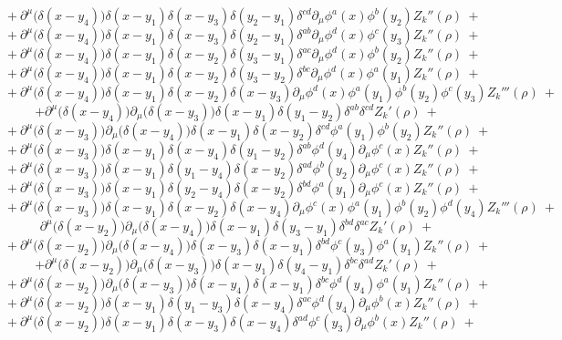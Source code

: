 $$+\ \partial^\mu\big(\delta(x - y_4)\big)\delta(x-y_1)\delta(x - y_3)\delta(y_2 - y_1)\delta^{cd}\partial_\mu\phi^{a}(x)\phi^{b}(y_2) Z_k''(\rho)\ +$$
$$+\ \partial^\mu\big(\delta(x - y_4)\big)\delta(x-y_1)\delta(x - y_3)\delta(y_2 - y_1)\delta^{ab}\partial_\mu\phi^{d}(x)\phi^{c}(y_3) Z_k''(\rho)\ +$$
$$+\ \partial^\mu\big(\delta(x - y_4)\big)\delta(x-y_1)\delta(x - y_2)\delta(y_3 - y_1)\delta^{ac}\partial_\mu\phi^{d}(x)\phi^{b}(y_2) Z_k''(\rho)\ +$$
$$+\ \partial^\mu\big(\delta(x - y_4)\big)\delta(x-y_1)\delta(x - y_2)\delta(y_3 - y_2)\delta^{bc}\partial_\mu\phi^{d}(x)\phi^{a}(y_1) Z_k''(\rho)\ +$$
$$+\ \partial^\mu\big(\delta(x - y_4)\big)\delta(x-y_1)\delta(x - y_2)\delta(x - y_3)\partial_\mu\phi^{d}(x)\phi^{a}(y_1)\phi^{b}(y_2)\phi^{c}(y_3) Z_k'''(\rho)\ +$$
$$+ \partial^\mu\big(\delta(x - y_4)\big)\partial_\mu\big(\delta(x-y_3)\big)\delta(x - y_1)\delta(y_1 - y_2)\delta^{ab}\delta^{cd} Z_k'(\rho)\ +$$
$$+\ \partial^\mu\big(\delta(x - y_3)\big)\partial_\mu\big(\delta(x-y_4)\big)\delta(x - y_1)\delta(x - y_2)\delta^{cd}\phi^{a}(y_1)\phi^{b}(y_2) Z_k''(\rho)\ +$$
$$+\ \partial^\mu\big(\delta(x - y_3)\big)\delta(x-y_1)\delta(x - y_4)\delta(y_1 - y_2)\delta^{ab}\phi^{d}(y_4)\partial_\mu\phi^{c}(x) Z_k''(\rho)\ +$$
$$+\ \partial^\mu\big(\delta(x - y_3)\big)\delta(x-y_1)\delta(y_1 - y_4)\delta(x - y_2)\delta^{ad}\phi^{b}(y_2)\partial_\mu\phi^{c}(x) Z_k''(\rho)\ +$$
$$+\ \partial^\mu\big(\delta(x - y_3)\big)\delta(x-y_1)\delta(y_2 - y_4)\delta(x - y_2)\delta^{bd}\phi^{a}(y_1)\partial_\mu\phi^{c}(x) Z_k''(\rho)\ +$$
$$+\ \partial^\mu\big(\delta(x - y_3)\big)\delta(x-y_1)\delta(x - y_2)\delta(x - y_4)\partial_\mu\phi^{c}(x)\phi^{a}(y_1)\phi^{b}(y_2)\phi^{d}(y_4) Z_k'''(\rho)\ +$$
$$ \partial^\mu\big(\delta(x - y_2)\big)\partial_\mu\big(\delta(x-y_4)\big)\delta(x - y_1)\delta(y_3 - y_1)\delta^{bd}\delta^{ac} Z_k'(\rho)\ +$$
$$+\ \partial^\mu\big(\delta(x - y_2)\big)\partial_\mu\big(\delta(x-y_4)\big)\delta(x - y_3)\delta(x - y_1)\delta^{bd}\phi^{c}(y_3)\phi^{a}(y_1) Z_k''(\rho)\ +$$
$$+ \partial^\mu\big(\delta(x - y_2)\big)\partial_\mu\big(\delta(x-y_3)\big)\delta(x - y_1)\delta(y_4 - y_1)\delta^{bc}\delta^{ad} Z_k'(\rho)\ +$$
$$+\ \partial^\mu\big(\delta(x - y_2)\big)\partial_\mu\big(\delta(x-y_3)\big)\delta(x - y_4)\delta(x - y_1)\delta^{bc}\phi^{d}(y_4)\phi^{a}(y_1) Z_k''(\rho)\ +$$
$$+\ \partial^\mu\big(\delta(x - y_2)\big)\delta(x-y_1)\delta(y_1 - y_3)\delta(x - y_4)\delta^{ac}\phi^{d}(y_4)\partial_\mu\phi^{b}(x) Z_k''(\rho)\ +$$
$$+\ \partial^\mu\big(\delta(x - y_2)\big)\delta(x-y_1)\delta(x - y_3)\delta(x - y_4)\delta^{ad}\phi^{c}(y_3)\partial_\mu\phi^{b}(x) Z_k''(\rho)\ +$$
